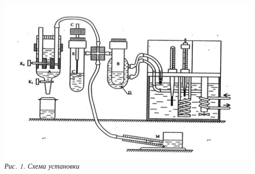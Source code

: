 \begin{center}

    \includegraphics[scale=0.6]{picks/2_5_1_scheme1.jpg} \\
    \textit{\textcolor[HTML]{000000}{Рис. 1. Схема установки}}

\end{center}

\newpage